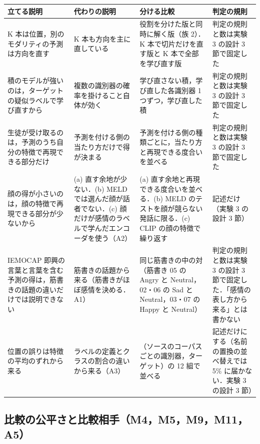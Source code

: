 \documentclass[11pt,a4paper]{ltjsarticle}
\begin{document}
\begin{center}\scriptsize
\begin{tabularx}{\linewidth}{@{}P{27mm}P{27mm}LP{37mm}@{}}
\toprule
立てる説明 & 代わりの説明 & 分ける比較 & 判定の規則 \\
\midrule
K 本は位置，別のモダリティの予測は方向を直す & K 本も方向を主に直している & 役割を分けた版と同時に解く版（族 2）．K 本で切片だけを直す版と K 本で全部を学び直す版 & 判定の規則と数は実験 3 の設計 3 節で固定した \\
積のモデルが強いのは，ターゲットの疑似ラベルで学び直すから & 複数の識別器の確率を掛けること自体が効く & 学び直さない積，学び直した各識別器 1 つずつ，学び直した積 & 判定の規則と数は実験 3 の設計 3 節で固定した \\
生徒が受け取るのは，予測のうち自分の特徴で再現できる部分だけ & 予測を付ける側の当たり方だけで得が決まる & 予測を付ける側の種類ごとに，当たり方と再現できる度合いを並べる & 判定の規則と数は実験 3 の設計 3 節で固定した \\
顔の得が小さいのは，顔の特徴で再現できる部分が少ないから & (a) 直す余地が少ない．(b) MELD では選んだ顔が話者でない．(c) 顔だけが感情のラベルで学んだエンコーダを使う（A2） & (a) 直す余地と再現できる度合いを並べる．(b) MELD のテストを顔が競らない発話に限る．(c) CLIP の顔の特徴で繰り返す & 記述だけ（実験 3 の設計 3 節） \\
IEMOCAP 即興の言葉と言葉を含む予測の得は，筋書きの話題の違いだけでは説明できない & 筋書きの話題から来る（筋書きがほぼ感情を決める．A1） & 同じ筋書きの中の対（筋書き 05 の Angry と Neutral，02・06 の Sad と Neutral，03・07 の Happy と Neutral） & 判定の規則と数は実験 3 の設計 3 節で固定した．「感情の表し方から来る」とは書かない \\
位置の誤りは特徴の平均のずれから来る & ラベルの定義とクラスの割合の違いから来る（A3） & （ソースのコーパスごとの識別器，ターゲット）の 12 組で並べる & 記述だけにする（名前の置換の並べ替えでは 5\% に届かない．実験 3 の設計 3 節） \\
\bottomrule
\end{tabularx}
\end{center}

\subsection{比較の公平さと比較相手（M4，M5，M9，M11，A5）}
\end{document}
